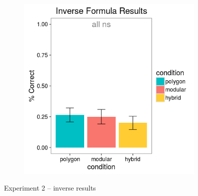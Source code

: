 \documentclass[man,mask,10pt]{apa6}
\begin{document}
\begin{figure}[H]
\begin{subfigure}[c]{0.3\textwidth}
\end{subfigure}
~
\begin{subfigure}[c]{0.3\textwidth}
\centering
\includegraphics[width=\textwidth]{figures/2/in_f_r.png}
\end{subfigure}
\caption{Experiment 2 -- inverse results}
\label{ex2_in}
\end{figure} 
\end{document}

